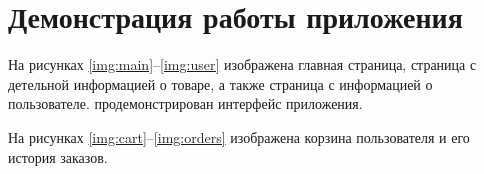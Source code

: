 \section{Демонстрация работы приложения}
На рисунках \ref{img:main}--\ref{img:user} изображена главная страница, страница  с детельной информацией о товаре, а также страница с информацией о пользователе.
продемонстрирован интерфейс приложения.




На рисунках \ref{img:cart}--\ref{img:orders} изображена корзина пользователя и его история заказов.
